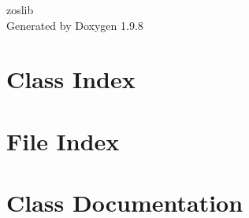 \documentclass[twoside]{book}
\newcommand{\+}{\discretionary{\mbox{\scriptsize$\hookleftarrow$}}{}{}}
\newcommand{\clearemptydoublepage}{%
    \newpage{\pagestyle{empty}\cleardoublepage}%
  }
\begin{document}
  \raggedbottom
    \hypersetup{pageanchor=false,
                bookmarksnumbered=true,
                pdfencoding=unicode
               }
  \begin{titlepage}
  \vspace*{7cm}
  \begin{center}%
  {\Large zoslib}\\
  \vspace*{1cm}
  {\large Generated by Doxygen 1.9.8}\\
  \end{center}
  \end{titlepage}
  \clearemptydoublepage
  \tableofcontents
  \clearemptydoublepage
  \hypersetup{pageanchor=true}


\chapter{Class Index}

\chapter{File Index}

\chapter{Class Documentation}















































\end{document}
